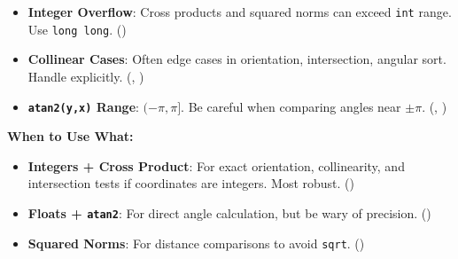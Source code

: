 \begin{summarycard}
\begin{itemize}
    \item \textbf{Integer Overflow}: Cross products and squared norms can exceed \texttt{int} range. Use \texttt{long long}. ()
    \item \textbf{Collinear Cases}: Often edge cases in orientation, intersection, angular sort. Handle explicitly. (, )
    \item \textbf{\texttt{atan2(y,x)} Range}: $(-\pi, \pi]$. Be careful when comparing angles near $\pm\pi$. (, )
\end{itemize}
\textbf{When to Use What:}
\begin{itemize}
    \item \textbf{Integers + Cross Product}: For exact orientation, collinearity, and intersection tests if coordinates are integers. Most robust. ()
    \item \textbf{Floats + \texttt{atan2}}: For direct angle calculation, but be wary of precision. ()
    \item \textbf{Squared Norms}: For distance comparisons to avoid \texttt{sqrt}. ()
\end{itemize}
\end{summarycard}
